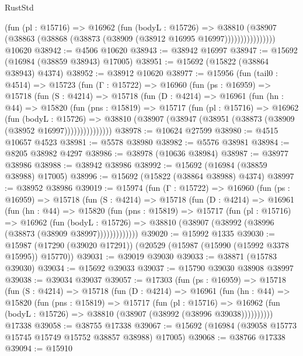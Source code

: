 \begin{lexlean}{RustStd}
\begin{coremodule}
                    (fun (pl : @15716) =>
                    @16962
                      (fun (bodyL : @15726) =>
                      @38810
                        (@38907
                          (@38863 (@38868 (@38873 (@38909 (@38912 @16995 @16997))))))))))))))))
    @10620
@38942 := @4506 @10620
@38943 := @38942 @16997
@38947 := @15692 (@16984 (@38859 @38943) @17005)
@38951 := @15692 (@15822 (@38864 @38943) @4374)
@38952 := @38912 @10620
@38977 := @15956
    (fun (tail0 : @4514) =>
    @15723
      (fun (Γ : @15722) =>
      @16960
        (fun (ps : @16959) =>
        @15718
          (fun (S : @4214) =>
          @15718
            (fun (D : @4214) =>
            @16961
              (fun (hn : @44) =>
              @15820
                (fun (pns : @15819) =>
                @15717
                  (fun (pl : @15716) =>
                  @16962
                    (fun (bodyL : @15726) =>
                    @38810 (@38907 (@38947 (@38951 (@38873 (@38909 (@38952 @16997)))))))))))))))
@38978 := @10624 @27599
@38980 := @4515 @10657 @4523
@38981 := @5578 @38980
@38982 := @5576 @38981
@38984 := @8205 @38982 @4297
@38986 := @38978 (@10636 @38984)
@38987 := @38977 @38986
@38988 := @38942 @38986
@38992 := @15692 (@16984 (@38859 @38988) @17005)
@38996 := @15692 (@15822 (@38864 @38988) @4374)
@38997 := @38952 @38986
@39019 := @15974
    (fun (Γ : @15722) =>
    @16960
      (fun (ps : @16959) =>
      @15718
        (fun (S : @4214) =>
        @15718
          (fun (D : @4214) =>
          @16961
            (fun (hn : @44) =>
            @15820
              (fun (pns : @15819) =>
              @15717
                (fun (pl : @15716) =>
                @16962
                  (fun (bodyL : @15726) =>
                  @38810 (@38907 (@38992 (@38996 (@38873 (@38909 @38997)))))))))))))
@39020 := @15992 @1335
@39030 := @15987 (@17290 (@39020 @17291)) (@20529 (@15987 (@15990 (@15992 @3378 @15995)) @15770))
@39031 := @39019 @39030
@39033 := @38871 (@15783 @39030)
@39034 := @15692 @39033
@39037 := @15790 @39030 @38908 @38997
@39038 := @39034 @39037
@39057 := @17303
    (fun (ps : @16959) =>
    @15718
      (fun (S : @4214) =>
      @15718
        (fun (D : @4214) =>
        @16961
          (fun (hn : @44) =>
          @15820
            (fun (pns : @15819) =>
            @15717
              (fun (pl : @15716) =>
              @16962 (fun (bodyL : @15726) => @38810 (@38907 (@38992 (@38996 @39038))))))))))
    @17338
@39058 := @38755 @17338
@39067 := @15692 (@16984 (@39058 @15773 @15745 @15749 @15752 @38857 @38988) @17005)
@39068 := @38766 @17338
@39094 := @15910

\end{coremodule}
\end{lexlean}
